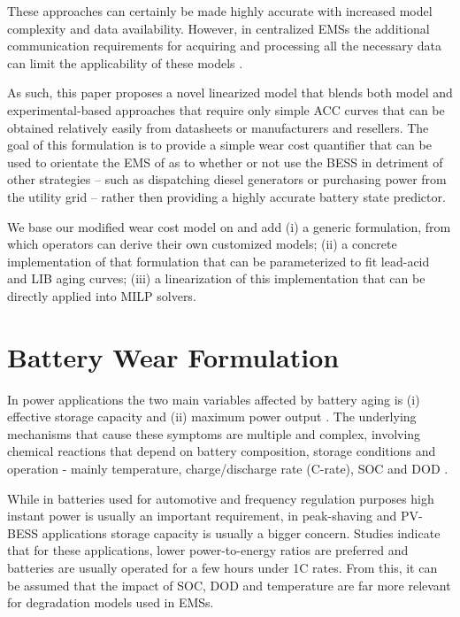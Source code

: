 \documentclass{ieeeaccess}
\begin{document}
    These approaches can certainly be made highly accurate with increased model complexity and data availability. However, in centralized \acp{EMS} the additional communication requirements for acquiring and processing all the necessary data can limit the applicability of these models \cite{DIMEASHATZIARGYRIOU2005}.

    As such, this paper proposes a novel linearized model that blends both model and experimental-based approaches that require only simple \ac{ACC} curves that can be obtained relatively easily from datasheets or manufacturers and resellers. The goal of this formulation is to provide a simple wear cost quantifier that can be used to orientate the \ac{EMS} of  as to whether or not use the \ac{BESS} in detriment of other strategies -- such as dispatching diesel generators or purchasing power from the utility grid -- rather then providing a highly accurate battery state predictor.

    We base our modified wear cost model on \cite{HAN2014} and add (i) a generic formulation, from which operators can derive their own customized models; (ii) a concrete implementation of that formulation that can be parameterized to fit lead-acid and \ac{LIB} aging curves; (iii) a linearization of this implementation that can be directly applied into \ac{MILP} solvers.

\section{Battery Wear Formulation}

    In power applications the two main variables affected by battery aging is (i) effective storage capacity and (ii) maximum power output \cite{han2014comparative, chemali2015minimizing, al2010mathematical}. The underlying mechanisms that cause these symptoms are multiple and complex, involving chemical reactions that depend on battery composition, storage conditions and operation - mainly temperature, charge/discharge rate (C-rate), \ac{SOC} and \ac{DOD} \cite{xiong2020lithium, vetter2005ageing, calearo2019modeling}.

    While in batteries used for automotive and frequency regulation purposes high instant power is usually an important requirement, in peak-shaving and PV-BESS applications storage capacity is usually a bigger concern. Studies \cite{hesse2017lithium, sufyan2019optimal, asano2007methodology} indicate that for these applications, lower power-to-energy ratios are preferred and batteries are usually operated for a few hours under 1C rates. From this, it can be assumed that the impact of \ac{SOC}, \ac{DOD} and temperature are far more relevant for degradation models used in \acp{EMS}.
\end{document}
